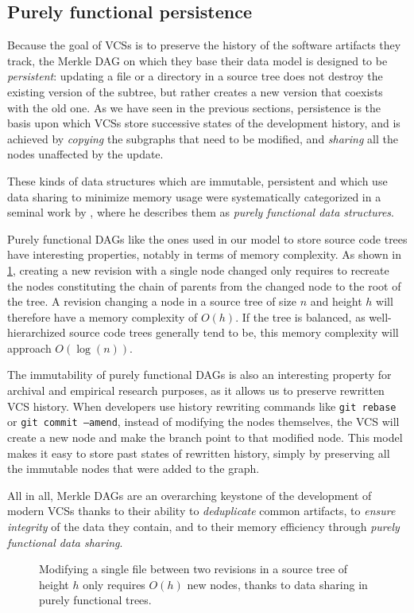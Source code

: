 \subsection{Purely functional persistence}%
\label{sec:purely-functional}

Because the goal of \glspl{VCS} is to preserve the history of the software
artifacts they track, the Merkle DAG on which they base their data model is
designed to be \emph{persistent}: updating a file or a directory in a source
tree does not destroy the existing version of the subtree, but rather creates a
new version that coexists with the old one. As we have seen in the previous
sections, persistence is the basis upon which \glspl{VCS} store successive
states of the development history, and is achieved by \emph{copying} the
subgraphs that need to be modified, and \emph{sharing} all the nodes unaffected
by the update.

These kinds of data structures which are immutable, persistent and which use
data sharing to minimize memory usage were systematically categorized in a
seminal work by \textcite{okasaki1999purely}, where he describes them as
\emph{purely functional data structures}.

Purely functional \glspl{DAG} like the ones used in our model to store source
code trees have interesting properties, notably in terms of memory complexity.
As shown in \cref{fig:okasaki-complexity}, creating a new revision with a
single node changed only requires to recreate the nodes constituting the chain
of parents from the changed node to the root of the tree. A revision changing a
node in a source tree of size $n$ and height $h$ will therefore have a memory
complexity of $O(h)$. If the tree is balanced, as well-hierarchized source code
trees generally tend to be, this memory complexity will approach $O(\log(n))$.

The immutability of purely functional \glspl{DAG} is also an interesting
property for archival and empirical research purposes, as it allows us to
preserve rewritten \gls{VCS} history. When developers use history rewriting
commands like \texttt{git rebase} or \texttt{git commit --amend}, instead of
modifying the nodes themselves, the \gls{VCS} will create a new node and make
the branch point to that modified node. This model makes it easy to store
past states of rewritten history, simply by preserving all the immutable nodes
that were added to the graph.

All in all, Merkle \glspl{DAG} are an overarching keystone of the development
of modern \glspl{VCS} thanks to their ability to \emph{deduplicate} common
artifacts, to \emph{ensure integrity} of the data they contain, and to their
memory efficiency through \emph{purely functional data sharing}.

\begin{figure}
    \centering
    
    \caption{Modifying a single file between two revisions in a source tree of
    height $h$ only requires $O(h)$ new nodes, thanks to data sharing in purely
    functional trees.}%
    \label{fig:okasaki-complexity}
\end{figure}
